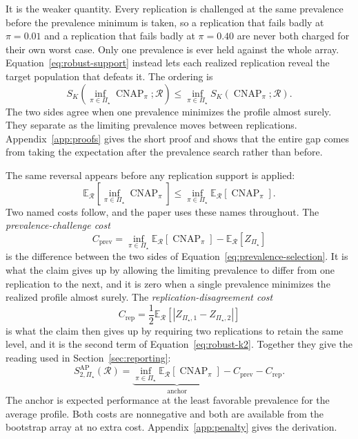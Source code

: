 \documentclass[11pt]{article}
\newcommand{\CNAP}{\operatorname{CNAP}}
\newcommand{\Regime}{\mathcal{R}}
\newcommand{\PSet}{\Pi_\star}
\newcommand{\E}{\mathbb{E}}
\theoremstyle{remark}
\begin{document}
It is the weaker quantity. Every replication is challenged at the same prevalence before the prevalence minimum is taken, so a replication that fails badly at $\pi=0.01$ and a replication that fails badly at $\pi=0.40$ are never both charged for their own worst case. Only one prevalence is ever held against the whole array. Equation~\eqref{eq:robust-support} instead lets each realized replication reveal the target population that defeats it. The ordering is
\begin{equation}
S_K\left(
\inf_{\pi\in\PSet}\CNAP_\pi;
\Regime
\right)
\leq
\inf_{\pi\in\PSet}
S_K(\CNAP_\pi;\Regime).
\label{eq:strong-weak-order}
\end{equation}
The two sides agree when one prevalence minimizes the profile almost surely. They separate as the limiting prevalence moves between replications. Appendix~\ref{app:proofs} gives the short proof and shows that the entire gap comes from taking the expectation after the prevalence search rather than before.

The same reversal appears before any replication support is applied:
\begin{equation}
\E_{\Regime}
\left[
\inf_{\pi\in\PSet}\CNAP_\pi
\right]
\leq
\inf_{\pi\in\PSet}
\E_{\Regime}
\left[
\CNAP_\pi
\right].
\label{eq:prevalence-selection}
\end{equation}
Two named costs follow, and the paper uses these names throughout. The \emph{prevalence-challenge cost}
\[
C_{\mathrm{prev}}
=
\inf_{\pi\in\PSet}\E_{\Regime}[\CNAP_\pi]
-
\E_{\Regime}[Z_{\PSet}]
\]
is the difference between the two sides of Equation~\eqref{eq:prevalence-selection}. It is what the claim gives up by allowing the limiting prevalence to differ from one replication to the next, and it is zero when a single prevalence minimizes the realized profile almost surely. The \emph{replication-disagreement cost}
\[
C_{\mathrm{rep}}
=
\frac12
\E_{\Regime}
\left[
|Z_{\PSet,1}-Z_{\PSet,2}|
\right]
\]
is what the claim then gives up by requiring two replications to retain the same level, and it is the second term of Equation~\eqref{eq:robust-k2}. Together they give the reading used in Section~\ref{sec:reporting}:
\begin{equation}
S_{2,\PSet}^{\mathrm{AP}}(\Regime)
=
\underbrace{\inf_{\pi\in\PSet}\E_{\Regime}[\CNAP_\pi]}_{\text{anchor}}
-
C_{\mathrm{prev}}
-
C_{\mathrm{rep}}.
\label{eq:two-costs}
\end{equation}
The anchor is expected performance at the least favorable prevalence for the average profile. Both costs are nonnegative and both are available from the bootstrap array at no extra cost. Appendix~\ref{app:penalty} gives the derivation.
\end{document}
